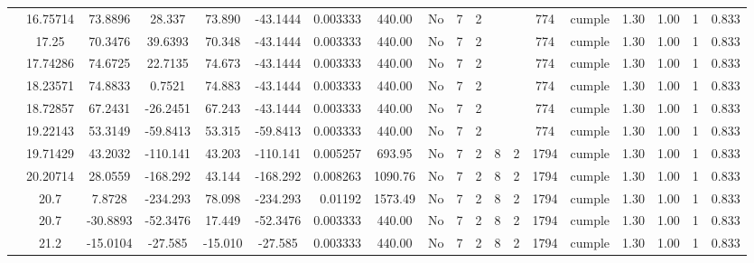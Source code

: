 \begin{table}[H]
{\begin{tabular}{|c|c|c|c|c|c|r|c|c|c|c|c|c|c|c|c|c|c|c|}
\cline{2-19}        & 16.75714 & 73.8896 & 28.337 & 73.890 & -43.1444 & 0.003333 & 440.00 & No  & 7   & 2   &     &     & 774 & \cellcolor[rgb]{ .776,  .937,  .808}cumple & 1.30 & 1.00 & 1   & 0.833 \bigstrut\\
\cline{2-19}        & 17.25 & 70.3476 & 39.6393 & 70.348 & -43.1444 & 0.003333 & 440.00 & No  & 7   & 2   &     &     & 774 & \cellcolor[rgb]{ .776,  .937,  .808}cumple & 1.30 & 1.00 & 1   & 0.833 \bigstrut\\
\cline{2-19}        & 17.74286 & 74.6725 & 22.7135 & 74.673 & -43.1444 & 0.003333 & 440.00 & No  & 7   & 2   &     &     & 774 & \cellcolor[rgb]{ .776,  .937,  .808}cumple & 1.30 & 1.00 & 1   & 0.833 \bigstrut\\
\cline{2-19}        & 18.23571 & 74.8833 & 0.7521 & 74.883 & -43.1444 & 0.003333 & 440.00 & No  & 7   & 2   &     &     & 774 & \cellcolor[rgb]{ .776,  .937,  .808}cumple & 1.30 & 1.00 & 1   & 0.833 \bigstrut\\
\cline{2-19}        & 18.72857 & 67.2431 & -26.2451 & 67.243 & -43.1444 & 0.003333 & 440.00 & No  & 7   & 2   &     &     & 774 & \cellcolor[rgb]{ .776,  .937,  .808}cumple & 1.30 & 1.00 & 1   & 0.833 \bigstrut\\
\cline{2-19}        & 19.22143 & 53.3149 & -59.8413 & 53.315 & -59.8413 & 0.003333 & 440.00 & No  & 7   & 2   &     &     & 774 & \cellcolor[rgb]{ .776,  .937,  .808}cumple & 1.30 & 1.00 & 1   & 0.833 \bigstrut\\
\cline{2-19}        & 19.71429 & 43.2032 & -110.141 & 43.203 & -110.141 & 0.005257 & 693.95 & No  & 7   & 2   & 8   & 2   & 1794 & \cellcolor[rgb]{ .776,  .937,  .808}cumple & 1.30 & 1.00 & 1   & 0.833 \bigstrut\\
\cline{2-19}        & 20.20714 & 28.0559 & -168.292 & 43.144 & -168.292 & 0.008263 & 1090.76 & No  & 7   & 2   & 8   & 2   & 1794 & \cellcolor[rgb]{ .776,  .937,  .808}cumple & 1.30 & 1.00 & 1   & 0.833 \bigstrut\\
\cline{2-19}        & \cellcolor[rgb]{ .851,  .882,  .949}20.7 & 7.8728 & -234.293 & 78.098 & -234.293 & 0.01192 & 1573.49 & No  & 7   & 2   & 8   & 2   & 1794 & \cellcolor[rgb]{ .776,  .937,  .808}cumple & 1.30 & 1.00 & 1   & 0.833 \bigstrut\\
\cline{2-19}        & \cellcolor[rgb]{ .851,  .882,  .949}20.7 & -30.8893 & -52.3476 & 17.449 & -52.3476 & 0.003333 & 440.00 & No  & 7   & 2   & 8   & 2   & 1794 & \cellcolor[rgb]{ .776,  .937,  .808}cumple & 1.30 & 1.00 & 1   & 0.833 \bigstrut\\
\cline{2-19}        & 21.2 & -15.0104 & -27.585 & -15.010 & -27.585 & 0.003333 & 440.00 & No  & 7   & 2   & 8   & 2   & 1794 & \cellcolor[rgb]{ .776,  .937,  .808}cumple & 1.30 & 1.00 & 1   & 0.833 \bigstrut\\

\end{tabular}}
\end{table}
